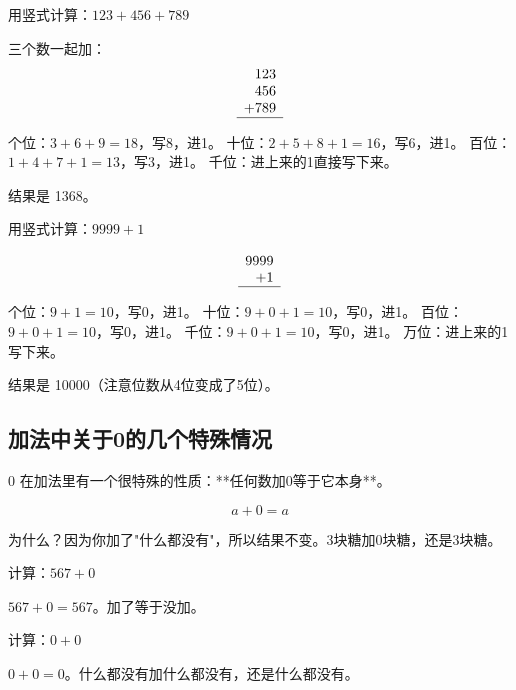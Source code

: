 \begin{example}
用竖式计算：$123+456+789$
\end{example}
\begin{solution}
三个数一起加：
\[
\begin{array}{r}
  123 \\
  456 \\
+ 789 \\ \hline
\end{array}
\]

个位：$3+6+9=18$，写8，进1。
十位：$2+5+8+1=16$，写6，进1。
百位：$1+4+7+1=13$，写3，进1。
千位：进上来的1直接写下来。

结果是 1368。
\end{solution}

\begin{example}
用竖式计算：$9999+1$
\end{example}
\begin{solution}
\[
\begin{array}{r}
  9999 \\
+    1 \\ \hline
\end{array}
\]

个位：$9+1=10$，写0，进1。
十位：$9+0+1=10$，写0，进1。
百位：$9+0+1=10$，写0，进1。
千位：$9+0+1=10$，写0，进1。
万位：进上来的1写下来。

结果是 10000（注意位数从4位变成了5位）。
\end{solution}

\subsection*{加法中关于0的几个特殊情况}

$0$ 在加法里有一个很特殊的性质：**任何数加0等于它本身**。

\[
a + 0 = a
\]

为什么？因为你加了"什么都没有"，所以结果不变。3块糖加0块糖，还是3块糖。

\begin{example}
计算：$567+0$
\end{example}
\begin{solution}
$567+0=567$。加了等于没加。
\end{solution}

\begin{example}
计算：$0+0$
\end{example}
\begin{solution}
$0+0=0$。什么都没有加什么都没有，还是什么都没有。
\end{solution}

